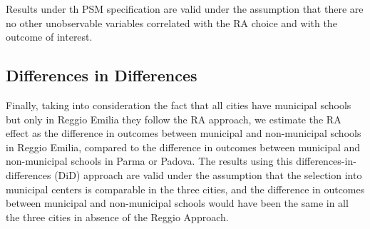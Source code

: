 \documentclass[12pt]{article}
\begin{document}
%
%
%
%

Results under th PSM specification are valid under the assumption that there are no other unobservable variables correlated with the RA choice and with the outcome of interest.

\subsection{Differences in Differences}

Finally, taking into consideration the fact that all cities have municipal schools but only in Reggio Emilia they follow the RA approach, we estimate the RA effect as the difference in outcomes between municipal and non-municipal schools in Reggio Emilia, compared to the difference in outcomes between municipal and non-municipal schools in Parma or Padova. The results using this differences-in-differences (DiD) approach are valid under the assumption that the selection into municipal centers is comparable in the three cities, and the difference in outcomes between municipal and non-municipal schools would have been the same in all the three cities in absence of the Reggio Approach.
\end{document}
